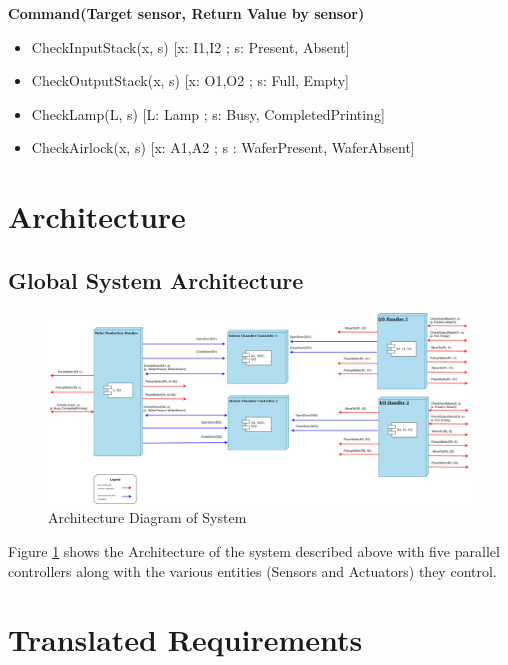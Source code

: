\documentclass[a4paper,12pt]{article}
\begin{document}
\textbf{Command(Target sensor, Return Value by sensor)}
\begin{itemize}
\item CheckInputStack(x, s)              [x: I1,I2 ; s: Present, Absent] 
\item CheckOutputStack(x, s)          [x: O1,O2 ; s: Full, Empty]
\item CheckLamp(L, s)	                  [L: Lamp ; s: Busy, CompletedPrinting]	
\item CheckAirlock(x, s)                    [x: A1,A2 ; s : WaferPresent, WaferAbsent]  %
\end{itemize}
\newpage
\section{Architecture}
\subsection{Global System Architecture}
\begin{figure}[ht]
\centering
    \includegraphics[width=\textwidth]{Architecture.jpg}
  \caption{Architecture Diagram of System}
  \label{fig:arch1}
\end{figure}
Figure \ref{fig:arch1} shows the Architecture of the system described above with five parallel controllers along with the various entities (Sensors and Actuators) they control.
\newpage
\section{Translated Requirements}
\end{document}
